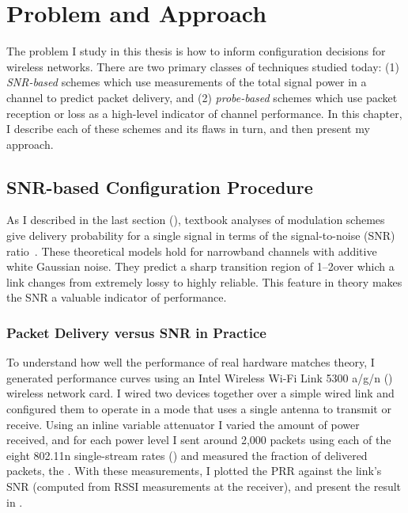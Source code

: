 \ifx\mainfile\undefined

\setcounter{chapter}{2} %
\fi

\cleardoublepage
\chapter{Problem and Approach}
\label{chap:problem}
\label{chap:approach}

The problem I study in this thesis is how to inform configuration decisions for wireless networks. There are two primary classes of techniques studied today: (1) \emph{SNR-based} schemes which use measurements of the total signal power in a channel to predict packet delivery, and (2) \emph{probe-based} schemes which use packet reception or loss as a high-level indicator of channel performance. In this chapter, I describe each of these schemes and its flaws in turn, and then present my approach.


\section{SNR-based Configuration Procedure}
As I described in the last section (), textbook analyses of modulation schemes give delivery probability for a single signal in terms of the signal-to-noise (SNR) ratio~\cite{Goldsmith}.
These theoretical models hold for narrowband channels with additive white Gaussian noise. They predict a sharp transition region of 1--2\dB over which a link changes from extremely lossy to highly reliable. This feature in theory makes the SNR a valuable indicator of performance.

\subsection{Packet Delivery versus SNR in Practice}
To understand how well the performance of real hardware matches theory, I generated performance curves using an Intel Wireless Wi-Fi Link 5300 a/g/n () wireless network card. I wired two devices together over a simple wired link and configured them to operate in a mode that uses a single antenna to transmit or receive. Using an inline variable attenuator I varied the amount of power received, and for each power level I sent around 2,000 packets using each of the eight 802.11n single-stream rates () and measured the fraction of delivered packets, the . With these measurements, I plotted the PRR against the link's SNR (computed from RSSI measurements at the receiver), and present the result in . 

